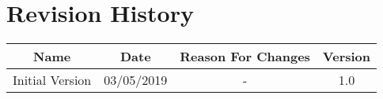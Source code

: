 \chapter{Revision History}

\begin{center}
  \begin{tabular}{|c|c|c|c|}
   \hline
   Name              & Date       & Reason For Changes & Version \\
   \hline
	  Initial Version & 03/05/2019 & - & 1.0     \\
   \hline
   
  \end{tabular}
\end{center}

